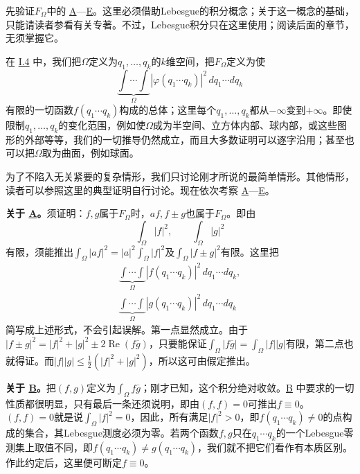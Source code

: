 \documentclass[fontsize=13pt,twoside,openany,headings=normal,parskip=false,bookmarkpackage=false,DIV=calc]{scrbook}
\begin{document}
先验证$F_\Omega$中的 \hyperref[ax:II.A]{A}—\hyperref[ax:II.E]{E}。这里必须借助Lebesgue的积分概念；关于这一概念的基础，只能请读者参看有关专著。不过，Lebesgue积分只在这里使用；阅读后面的章节，无须掌握它。

在 \hyperref[sec:I.4]{I.4} 中，我们把$\Omega$定义为$q_1,\allowbreak \ldots,\allowbreak q_k$的$k$维空间，把$F_\Omega$定义为使
\[
\underbrace{\int\cdots\int}_{\Omega}|\varphi(q_1\cdots q_k)|^2\,dq_1\cdots dq_k
\]
有限的一切函数$f(q_1\cdots q_k)$构成的总体；这里每个$q_1,\allowbreak \ldots,\allowbreak q_k$都从$-\infty$变到$+\infty$。即使限制$q_1,\allowbreak \ldots,\allowbreak q_k$的变化范围，例如使$\Omega$成为半空间、立方体内部、球内部，或这些图形的外部等等，我们的一切推导仍然成立，而且大多数证明可以逐字沿用；甚至也可以把$\Omega$取为曲面，例如球面。

\hypertarget{origpage-32}{}\label{origpage-32}为了不陷入无关紧要的复杂情形，我们只讨论刚才所说的最简单情形。其他情形，读者可以参照这里的典型证明自行讨论。现在依次考察 \hyperref[ax:II.A]{A}—\hyperref[ax:II.E]{E}。

\textbf{关于 \hyperref[ax:II.A]{A}。}须证明：$f,\allowbreak g$属于$F_\Omega$时，$af,\allowbreak f\pm g$也属于$F_\Omega$。即由
\[
\int_\Omega|f|^2,\qquad\int_\Omega|g|^2
\]
有限，须能推出$\int_\Omega|af|^2=|a|^2\int_\Omega|f|^2$及$\int_\Omega|f\pm g|^2$有限。这里把
\begin{gather*}
\underbrace{\int\cdots\int}_{\Omega}|f(q_1\cdots q_k)|^2\,dq_1\cdots dq_k,\\
\underbrace{\int\cdots\int}_{\Omega}|g(q_1\cdots q_k)|^2\,dq_1\cdots dq_k
\end{gather*}
简写成上述形式，不会引起误解。第一点显然成立。由于$|f\pm g|^2=|f|^2+|g|^2\pm2\operatorname{Re}(f\overline g)$，只要能保证$\int_\Omega|f\overline g|=\int_\Omega|f||g|$有限，第二点也就得证。而$|f||g|\leq\frac12(|f|^2+|g|^2)$，所以这可由假定推出。

\textbf{关于 \hyperref[ax:II.B]{B}。}把$(f,\allowbreak g)$定义为$\int_\Omega f\overline g$；刚才已知，这个积分绝对收敛。\hyperref[ax:II.B]{B} 中要求的一切性质都很明显，只有最后一条还须说明，即由$(f,\allowbreak f)=0$可推出$f\equiv0$。$(f,\allowbreak f)=0$就是说$\int_\Omega|f|^2=0$，因此，所有满足$|f|^2>0$，即$f(q_1\cdots q_k)\ne0$的点构成的集合，其Lebesgue测度必须为零。若两个函数$f,\allowbreak g$只在$q_1\cdots q_k$的一个Lebesgue零测集上取值不同，即$f(q_1\cdots q_k)\ne g(q_1\cdots q_k)$，我们就不把它们看作有本质区别。作此约定后，这里便可断定$f\equiv0$。
\end{document}
